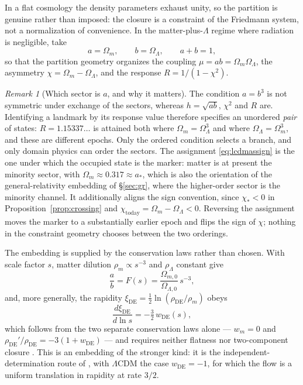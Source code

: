 \documentclass[11pt,a4paper]{article}
\theoremstyle{definition}
\theoremstyle{plain}
\theoremstyle{remark}
\newtheorem{remark}[definition]{Remark}
\begin{document}
In a flat cosmology the density parameters exhaust unity, so the partition is
genuine rather than imposed: the closure is a constraint of the Friedmann
system, not a normalization of convenience. In the matter-plus-$\Lambda$ regime
where radiation is negligible, take
\begin{equation}
a=\Omega_{m},\qquad b=\Omega_{\Lambda},\qquad a+b=1 ,
\label{eq:lcdmassign}
\end{equation}
so that the partition geometry organizes the coupling
$\mu=ab=\Omega_{m}\Omega_{\Lambda}$, the asymmetry
$\chi=\Omega_{m}-\Omega_{\Lambda}$, and the response $R=1/(1-\chi^{2})$.

\begin{remark}[Which sector is $a$, and why it matters]
\label{rem:ordering}
The condition $a=b^{3}$ is not symmetric under exchange of the sectors, whereas
$h=\sqrt{ab}$, $\chi^{2}$ and $R$ are. Identifying a landmark by its response
value therefore specifies an unordered \emph{pair} of states: $R=1.15337\ldots$
is attained both where $\Omega_{m}=\Omega_{\Lambda}^{3}$ and where
$\Omega_{\Lambda}=\Omega_{m}^{3}$, and these are different epochs. Only the
ordered condition selects a branch, and only domain physics can order the
sectors. The assignment \eqref{eq:lcdmassign} is the one under which the
occupied state is the marker: matter is at present the minority sector, with
$\Omega_{m}\approx 0.317\approx a_{*}$, which is also the orientation of the
general-relativity embedding of \S\ref{sec:gr}, where the higher-order sector
is the minority channel. It additionally aligns the sign convention, since
$\chi_{*}<0$ in Proposition~\ref{prop:crossing} and
$\chi_{\mathrm{today}}=\Omega_{m}-\Omega_{\Lambda}<0$. Reversing the assignment
moves the marker to a substantially earlier epoch and flips the sign of $\chi$;
nothing in the constraint geometry chooses between the two orderings.
\end{remark}

The embedding is supplied by the conservation laws rather than chosen. With
scale factor $s$, matter dilution $\rho_{m}\propto s^{-3}$ and
$\rho_{\Lambda}$ constant give
\begin{equation}
\frac{a}{b}=F(s)=\frac{\Omega_{m,0}}{\Omega_{\Lambda,0}}\,s^{-3} ,
\label{eq:lcdmembed}
\end{equation}
and, more generally, the rapidity
$\xi_{\mathrm{DE}}=\tfrac12\ln(\rho_{\mathrm{DE}}/\rho_{m})$ obeys
\begin{equation}
\frac{d\xi_{\mathrm{DE}}}{d\ln s}
=-\tfrac{3}{2}\,w_{\mathrm{DE}}(s) ,
\label{eq:rapidityw}
\end{equation}
which follows from the two separate conservation laws alone --- $w_{m}=0$ and
$\rho_{\mathrm{DE}}'/\rho_{\mathrm{DE}}=-3(1+w_{\mathrm{DE}})$ --- and requires
neither flatness nor two-component closure \cite{PartitionFlow}. This is an
embedding of the stronger kind: it is the independent-determination route of
\cite{EffPot}, with $\Lambda$CDM the case $w_{\mathrm{DE}}=-1$, for which the
flow is a uniform translation in rapidity at rate $3/2$.
\end{document}
